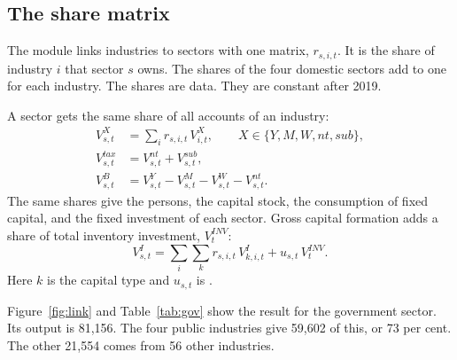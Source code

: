 \documentclass[11pt,a4paper]{article}
\newcommand{\code}[1]{\texttt{\detokenize{#1}}}
\begin{document}
\subsection{The share matrix}

The module \code{IndustrySectors} links industries to sectors with one matrix, $r_{s,i,t}$.
It is the share of industry $i$ that sector $s$ owns. The shares of the four domestic sectors add to one for each industry.
The shares are data. They are constant after 2019.

A sector gets the same share of all accounts of an industry:
\begin{align}
V^X_{s,t} &= \sum_i r_{s,i,t}\, V^X_{i,t}, \qquad X \in \{Y, M, W, \mathit{nt}, \mathit{sub}\}, \label{eq:share} \\
V^{\mathit{tax}}_{s,t} &= V^{\mathit{nt}}_{s,t} + V^{\mathit{sub}}_{s,t}, \\
V^B_{s,t} &= V^Y_{s,t} - V^M_{s,t} - V^W_{s,t} - V^{\mathit{nt}}_{s,t} . \label{eq:surplus}
\end{align}
The same shares give the persons, the capital stock, the consumption of fixed capital, and the fixed investment of each sector.
Gross capital formation adds a share of total inventory investment, $V^{\mathit{INV}}_t$:
\begin{equation}
V^I_{s,t} = \sum_i \sum_k r_{s,i,t}\, V^I_{k,i,t} + u_{s,t}\, V^{\mathit{INV}}_t .
\label{eq:investment}
\end{equation}
Here $k$ is the capital type and $u_{s,t}$ is \code{uINV_s}.

Figure~\ref{fig:link} and Table~\ref{tab:gov} show the result for the government sector.
Its output is 81,156. The four public industries give 59,602 of this, or 73 per cent.
The other 21,554 comes from 56 other industries.
\end{document}
